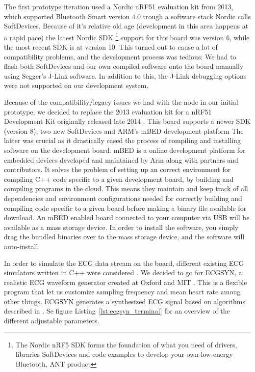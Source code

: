 The first prototype iteration used a Nordic nRF51 evaluation kit from 2013, which supported Bluetooth Smart version 4.0 trough a software stack Nordic calls SoftDevices. Because of it's relative old age (development in this area happens at a rapid pace) the latest Nordic SDK \footnote{The Nordic nRF5 SDK forms the foundation of what you need of drivers, libraries SoftDevices and code examples to develop your own low-energy Bluetooth, ANT product} support for this board was version 6, while the most recent SDK is at version 10. This turned out to cause a lot of compatibility problems, and the development process was tedious: We had to flash both SoftDevices and our own compiled software onto the board manually using Segger's J-Link software. In addition to this, the J-Link debugging options were not supported on our development system.

Because of the compatibility/legacy issues we had with the node in our initial prototype, we decided to replace the 2013 evaluation kit for a nRF51 Development Kit originally released late 2014 \cite{newRef_53}. This board supports a newer SDK (version 8), two new SoftDevices and ARM's mBED development platform \cite{newRef_54} The latter was crucial as it drastically eased the process of compiling and installing software on the development board. mBED is a online development platform for embedded devices developed and maintained by Arm \cite{newRef_55} along with partners and contributors. It solves the problem of setting up an correct environment for compiling C++ code specific to a given development board, by building and compiling programs in the cloud. This means they maintain and keep track of all dependencies and environment configurations needed for correctly building and compiling code specific to a given board before making a binary file available for download. An mBED enabled board connected to your computer via USB will be available as a mass storage device. In order to install the software, you simply drag the bundled binaries over to the mass storage device, and the software will auto-install. 

In order to simulate the ECG data stream on the board, different existing ECG simulators written in C++ were considered \cite{newRef_56, newRef_56_1, newRef_56_2}. We decided to go for ECGSYN, a realistic ECG waveform generator created at Oxford and MIT \cite{newRef_56_2}. This is a flexible program that let us customize sampling frequency and mean heart rate among other things. ECGSYN generates a synthesized ECG signal based on algorithms described in \cite{newRef_58}. Se figure Listing~\ref{lst:ecgsyn_terminal} for an overview of the different adjustable parameters.

